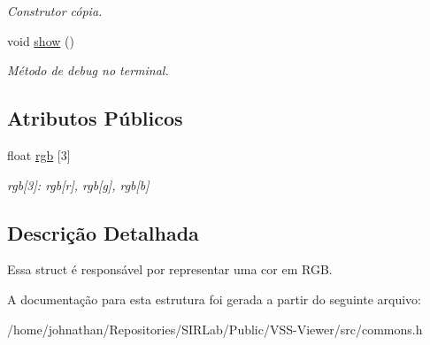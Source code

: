 \begin{DoxyCompactItemize}
\begin{DoxyCompactList}\small\item\em Construtor cópia. \end{DoxyCompactList}\item 
void \hyperlink{structcommon_1_1Pixel_a384d642e3fb610b38c813ff6fd8c50e1}{show} ()\hypertarget{structcommon_1_1Pixel_a384d642e3fb610b38c813ff6fd8c50e1}{}\label{structcommon_1_1Pixel_a384d642e3fb610b38c813ff6fd8c50e1}

\begin{DoxyCompactList}\small\item\em Método de debug no terminal. \end{DoxyCompactList}\end{DoxyCompactItemize}
\subsection*{Atributos Públicos}
\begin{DoxyCompactItemize}
\item 
float \hyperlink{structcommon_1_1Pixel_abf3e7070359fa300aeed9af22c74f118}{rgb} \mbox{[}3\mbox{]}\hypertarget{structcommon_1_1Pixel_abf3e7070359fa300aeed9af22c74f118}{}\label{structcommon_1_1Pixel_abf3e7070359fa300aeed9af22c74f118}

\begin{DoxyCompactList}\small\item\em rgb\mbox{[}3\mbox{]}\+: rgb\mbox{[}r\mbox{]}, rgb\mbox{[}g\mbox{]}, rgb\mbox{[}b\mbox{]} \end{DoxyCompactList}\end{DoxyCompactItemize}


\subsection{Descrição Detalhada}
Essa struct é responsável por representar uma cor em R\+GB. 

A documentação para esta estrutura foi gerada a partir do seguinte arquivo\+:\begin{DoxyCompactItemize}
\item 
/home/johnathan/\+Repositories/\+S\+I\+R\+Lab/\+Public/\+V\+S\+S-\/\+Viewer/src/commons.\+h\end{DoxyCompactItemize}

